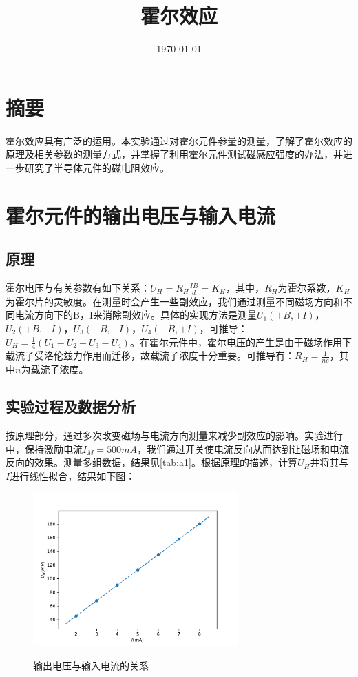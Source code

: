\documentclass[12pt]{article}
\title{霍尔效应}
\author{}
\date{\today}
\begin{document}
\maketitle
\setlength{\parindent}{2em}

\section*{摘要}

霍尔效应具有广泛的运用。本实验通过对霍尔元件参量的测量，了解了霍尔效应的原理及相关参数的测量方式，并掌握了利用霍尔元件测试磁感应强度的办法，并进一步研究了半导体元件的磁电阻效应。

\section{霍尔元件的输出电压与输入电流}

\subsection{原理}
霍尔电压与有关参数有如下关系：$U_H = R_H \frac{IB}{d}=K_H$，其中，$R_H$为霍尔系数，$K_H$为霍尔片的灵敏度。在测量时会产生一些副效应，我们通过测量不同磁场方向和不同电流方向下的B，I来消除副效应。具体的实现方法是测量$U_1(+B,+I)$，$U_2(+B,-I)$，$U_3(-B,-I)$，$U_4(-B,+I)$，可推导：$U_H=\frac{1}{4}(U_1-U_2+U_3-U_4)$。在霍尔元件中，霍尔电压的产生是由于磁场作用下载流子受洛伦兹力作用而迁移，故载流子浓度十分重要。可推导有：$R_H=\frac{1}{ne}$，其中$n$为载流子浓度。

\subsection{实验过程及数据分析}
按原理部分，通过多次改变磁场与电流方向测量来减少副效应的影响。实验进行中，保持激励电流$I_M=500mA$，我们通过开关使电流反向从而达到让磁场和电流反向的效果。测量多组数据，结果见\ref{tab:a1}。根据原理的描述，计算$U_H$并将其与$I$进行线性拟合，结果如下图：

\begin{figure}[H]
    \centering
    \includegraphics[width=0.7\textwidth]{part1.pdf}
    \label{fig:1}
    \caption{输出电压与输入电流的关系}
\end{figure}
\end{document}
